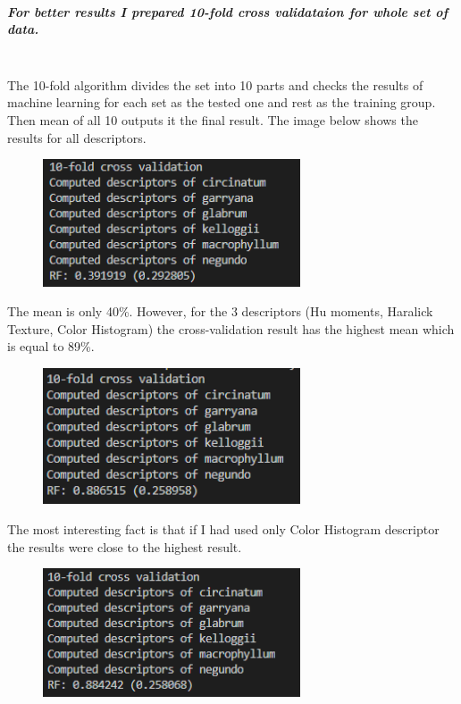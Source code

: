 \documentclass[12pt]{article}
\begin{document}
\subparagraph{
For better results I prepared 10-fold cross validataion for whole set of data.\\\\
}

The 10-fold algorithm divides the set into 10 parts and checks the results of machine learning for each set as the tested one and rest as the training group. Then mean of all 10 outputs it the final result. The image below shows the results for all descriptors.

\begin{figure}[h!]
\centering
\includegraphics[width=3in]{Cross_1.png}
\end{figure}

The mean is only 40\%. However, for the 3 descriptors (Hu moments, Haralick Texture, Color Histogram) the cross-validation result has the highest mean which is equal to 89\%.


\begin{figure}[h!]
\centering
\includegraphics[width=3in]{Cross_for3.png}
\end{figure}

The most interesting fact is that if I had used only Color Histogram descriptor the results were close to the highest result.

\begin{figure}[h!]
\centering
\includegraphics[width=3in]{Cross_histogram.png}
\end{figure}
\end{document}
